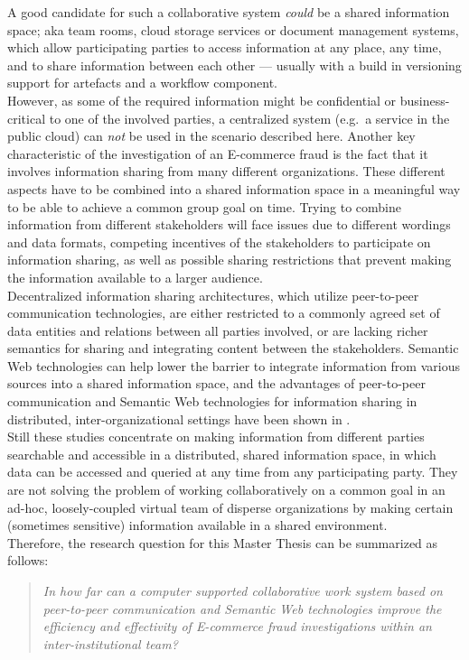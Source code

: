 A good candidate for such a collaborative system \emph{could} be a shared information space; aka team rooms, cloud storage services or document management systems, which allow participating parties to access information at any place, any time, and to share information between each other --- usually with a build in versioning support for artefacts and a workflow component. \\

However, as some of the required information might be confidential or business-critical to one of the involved parties, a centralized system (e.g.\ a service in the public cloud) can \emph{not} be used in the scenario described here. Another key characteristic of the investigation of an \gls{E-commerce} fraud is the fact that it involves information sharing from many different organizations. These different aspects have to be combined into a shared information space in a meaningful way to be able to achieve a common group goal on time. Trying to combine information from different stakeholders will face issues due to different wordings and data formats, competing incentives of the stakeholders to participate on information sharing, as well as possible sharing restrictions that prevent making the information available to a larger audience. \\

Decentralized information sharing architectures, which utilize peer-to-peer communication technologies, are either restricted to a commonly agreed set of data entities and relations between all parties involved, or are lacking richer semantics for sharing and integrating content between the stakeholders. Semantic Web technologies can help lower the barrier to integrate information from various sources into a shared information space, and the advantages of peer-to-peer communication and Semantic Web technologies for information sharing in distributed, inter-organizational settings have been shown in \citep{Staab2006}. \\

Still these studies concentrate on making information from different parties searchable and accessible in a distributed, shared information space, in which data can be accessed and queried at any time from any participating party. They are not solving the problem of working collaboratively on a common goal in an ad-hoc, loosely-coupled virtual team of disperse organizations by making certain (sometimes sensitive) information available in a shared environment. \\

Therefore, the research question for this Master Thesis can be summarized as follows: \@

\begin{quotation}
  \textit{In how far can a computer supported collaborative work system based on peer-to-peer communication and Semantic Web technologies improve the efficiency and effectivity of \gls{E-commerce} fraud investigations within an inter-institutional team?}
\end{quotation}

